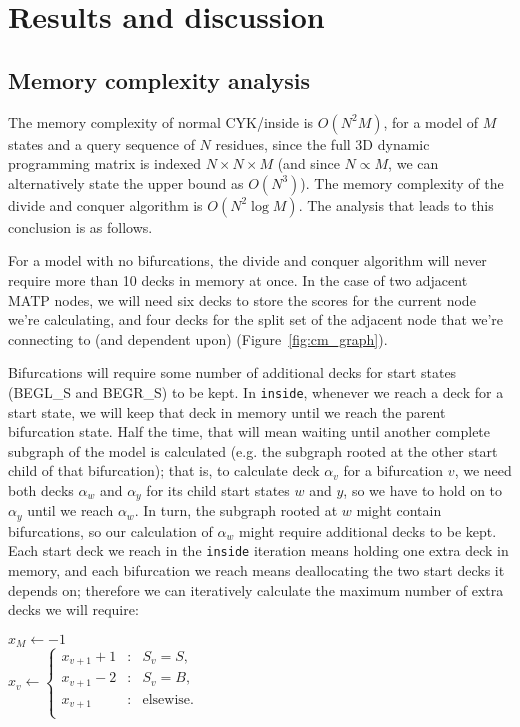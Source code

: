 \documentclass[11pt]{article}
\begin{document}
\section{Results and discussion}

\subsection{Memory complexity analysis}

The memory complexity of normal CYK/inside is $O(N^2M)$, for a model
of $M$ states and a query sequence of $N$ residues, since the full 3D
dynamic programming matrix is indexed $N \times N \times M$ (and since
$N \propto M$, we can alternatively state the upper bound as
$O(N^3)$). The memory complexity of the divide and conquer algorithm
is $O(N^2 \log M)$. The analysis that leads to this conclusion is as
follows.

For a model with no bifurcations, the divide and conquer algorithm
will never require more than 10 decks in memory at once. In the case
of two adjacent MATP nodes, we will need six decks to store the scores
for the current node we're calculating, and four decks for the split
set of the adjacent node that we're connecting to (and dependent
upon) (Figure~\ref{fig:cm_graph}).

Bifurcations will require some number of additional decks for start
states (BEGL\_S and BEGR\_S) to be kept. In \texttt{inside}, whenever
we reach a deck for a start state, we will keep that deck in memory
until we reach the parent bifurcation state. Half the time, that will
mean waiting until another complete subgraph of the model is
calculated (e.g. the subgraph rooted at the other start child of that
bifurcation); that is, to calculate deck $\alpha_v$ for a bifurcation
$v$, we need both decks $\alpha_w$ and $\alpha_y$ for its child start
states $w$ and $y$, so we have to hold on to $\alpha_y$ until we reach
$\alpha_w$. In turn, the subgraph rooted at $w$ might contain
bifurcations, so our calculation of $\alpha_w$ might require
additional decks to be kept. Each start deck we reach in the
\texttt{inside} iteration means holding one extra deck in memory, and
each bifurcation we reach means deallocating the two start decks it
depends on; therefore we can iteratively calculate the maximum number
of extra decks we will require:

\begin{algorithm}
\begin{algtab*}
  $x_M \leftarrow -1$\\
     $x_v \leftarrow \left\{ 
       \begin{array}{rcl} 
        x_{v+1} + 1 &:& S_v = S,\\
        x_{v+1} - 2 &:& S_v = B,\\
        x_{v+1}     &:& \mbox{elsewise.}\\
       \end{array} \right.$\\
  \\
\end{algtab*}
\end{algorithm}
\end{document}
